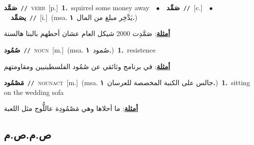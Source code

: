 \documentclass[10pt,a4paper,twoside]{article} %
\begin{document}
\begin{multicols}{2}
{\setlength\topsep{0pt}\textbf{\foreignlanguage{arabic}{صَمَّد}}\ {\color{gray}\texttt{//}\color{black}}\ \textsc{verb}\ [p.]\ \textbf{1.}~squirrel some money away\ \ $\bullet$\ \ \setlength\topsep{0pt}\textbf{\foreignlanguage{arabic}{صَمِّد}}\ {\color{gray}\texttt{//}\color{black}}\ [c.]\ \ $\bullet$\ \ \setlength\topsep{0pt}\textbf{\foreignlanguage{arabic}{يصَمِّد}}\ {\color{gray}\texttt{//}\color{black}}\ [i.]\ \color{gray}(msa. \foreignlanguage{arabic}{يَدَّخِر مبلغ من المال}~\foreignlanguage{arabic}{\textbf{١.}})\color{black}\  \begin{flushright}\color{gray}\foreignlanguage{arabic}{\textbf{\underline{\foreignlanguage{arabic}{أمثلة}}}: صَمَّدِت 2000 شيكل العام عشان أحطهم بالبنا هالسنة}\end{flushright}\color{black}} \vspace{2mm}

{\setlength\topsep{0pt}\textbf{\foreignlanguage{arabic}{صُمُود}}\ {\color{gray}\texttt{//}\color{black}}\ \textsc{noun}\ [m.]\ \color{gray}(msa. \foreignlanguage{arabic}{صُمود}~\foreignlanguage{arabic}{\textbf{١.}})\color{black}\ \textbf{1.}~resistence\  \begin{flushright}\color{gray}\foreignlanguage{arabic}{\textbf{\underline{\foreignlanguage{arabic}{أمثلة}}}: في برنامج وثائقي عن صُمُود الفلسطينيين ومقاومتهم}\end{flushright}\color{black}} \vspace{2mm}

{\setlength\topsep{0pt}\textbf{\foreignlanguage{arabic}{مَصْمُود}}\ {\color{gray}\texttt{//}\color{black}}\ \textsc{noun\textunderscore act}\ [m.]\ \color{gray}(msa. \foreignlanguage{arabic}{جالس على الكنبة المخصصة للعرسان}~\foreignlanguage{arabic}{\textbf{١.}})\color{black}\ \textbf{1.}~sitting on the wedding sofa\  \begin{flushright}\color{gray}\foreignlanguage{arabic}{\textbf{\underline{\foreignlanguage{arabic}{أمثلة}}}: ما أحلاها وهي مَصْمُودِة عاللُّوج مثل اللعبة}\end{flushright}\color{black}} \vspace{2mm}

\vspace{-3mm}
\subsection*{\color{blue}\foreignlanguage{arabic}{ص.م.ص.م}\color{blue}{}} 


\end{multicols}
\end{document}
